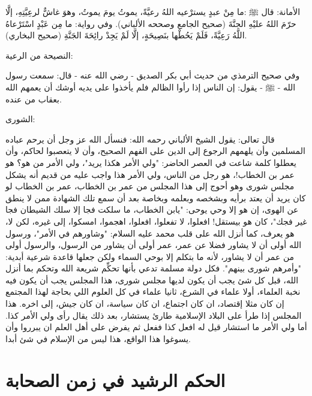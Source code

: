 الأمانة:
قال ﷺ :ما مِنْ عبدٍ يسترْعيه اللهُ رعيَّةً، يموتُ يومَ يموتُ، وهوَ غاشٌّ لرعِيَّتِهِ، إلَّا حرّمَ اللهُ عليْهِ الجنَّةَ {\footnotesize (صحيح الجامع وصححه الألباني)}. وفي رواية: ما مِن عَبْدٍ اسْتَرْعاهُ اللَّهُ رَعِيَّةً، فَلَمْ يَحُطْها بنَصِيحَةٍ، إلَّا لَمْ يَجِدْ رائِحَةَ الجَنَّةِ {\footnotesize (صحيح البخاري)}.

النصيحة من الرعية: 

وفي صحيح الترمذي من حديث أبي بكر الصديق - رضي الله عنه - قال: سمعت رسول الله - ﷺ - يقول: إن الناس إذا رأوا الظالم فلم يأخذوا على يديه أوشك أن يعمهم الله بعقاب من عنده.

الشورى: 

قال تعالى: \quranayah*[42][38]{\footnotesize \surahname*[42]} يقول الشيخ الألباني رحمه الله: فنسأل الله عز وجل أن يرحم عباده المسلمين وأن يلهمهم الرجوع إلى الدين على الفهم الصحيح، وأن لا يتعصبوا لحاكم، وأن يعطلوا كلمة شاعت في العصر الحاضر: "ولي الأمر هكذا يريد"، ولي الأمر من هو؟ هو عمر بن الخطاب!، هو رجل من الناس، ولي الأمر هذا واجب عليه من قديم أنه يشكل مجلس شورى وهو أحوج إلى هذا المجلس من عمر بن الخطاب، عمر بن الخطاب لو كان يريد أن يعتد برأيه وبشخصه وبعلمه وبخاصة بعد أن سمع تلك الشهادة ممن لا ينطق عن الهوى، إن هو إلا وحي يوحى: "يابن الخطاب، ما سلكت فجا إلا سلك الشيطان فجا غير فجك"، كان هو بيستقل! افعلوا، لا تفعلوا، افعلوا، اهجموا، امسكوا، إلى غيره، لكن لا، هو يعرف، كما أنزل الله على قلب محمد عليه السلام: "وشاورهم في الأمر"، ورسول الله أولى أن لا يشاور فضلا عن عمر، عمر أولى أن يشاور من الرسول، والرسول أولى من عمر أن لا يشاور، لأنه ما بتكلم إلا بوحي السماء ولكن جعلها قاعدة شرعية أبدية: "وأمرهم شورى بينهم". فكل دولة مسلمة تدعي بأنها تحكِّم شريعة الله وتحكم بما أنزل الله، قبل كل شئ يجب أن يكون لديها مجلس شورى، هذا المجلس يجب أن يكون فيه نخبة العلماء، أولا علماء في الشرع، ثانيا علماء في كل العلوم اللي بحاجة لهذا المجتمع إن كان مثلا إقتصاد، ان كان اجتماع، ان كان سياسة، ان كان جيش، إلى اخره. هذا المجلس إذا طرأ على البلاد الإسلامية طارئ يستشار، بعد ذلك يقال رأى ولي الأمر كذا. أما ولي الأمر ما استشار قيل له افعل كذا ففعل ثم يفرض على أهل العلم ان يبرروا وأن يسوغوا هذا الواقع، هذا ليس من الإسلام في شئ أبدا. 


\section{الحكم الرشيد في زمن الصحابة}

